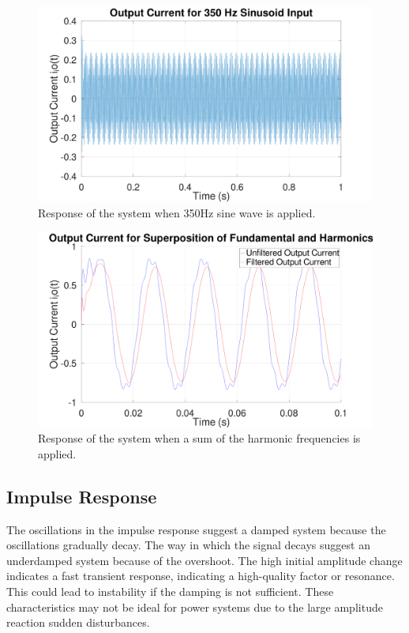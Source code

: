 \documentclass[11pt]{article}
\begin{document}
\begin{FIGURE}
\begin{figure}[H]
\centering
\includegraphics[width=.9\linewidth]{ENG204-Assignment-4-350Hz.png}
\caption{Response of the system when 350Hz sine wave is applied.}
\end{figure}
\end{FIGURE}
\begin{FIGURE}
\begin{figure}[H]
\centering
\includegraphics[width=.9\linewidth]{ENG204-Assignment-4-Super.png}
\caption{Response of the system when a sum of the harmonic frequencies is applied.}
\end{figure}
\end{FIGURE}
\subsection{Impulse Response}
\label{sec:orga0a5b7c}
The oscillations in the impulse response suggest a damped system because the oscillations gradually decay. The way in which the signal decays suggest an underdamped system because of the overshoot. The high initial amplitude change indicates a fast transient response, indicating a high-quality factor or resonance. This could lead to instability if the damping is not sufficient. These characteristics may not be ideal for power systems due to the large amplitude reaction sudden disturbances.
\end{document}

